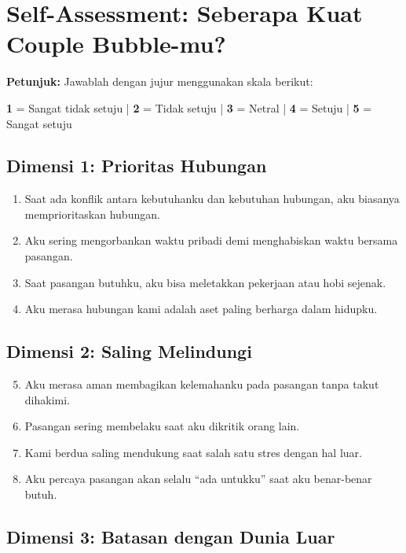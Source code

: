 \section{Self-Assessment: Seberapa Kuat Couple Bubble-mu?}

\begin{exercisebox}
\textbf{Petunjuk:} Jawablah dengan jujur menggunakan skala berikut:
\begin{center}
\textbf{1} = Sangat tidak setuju \quad | \quad \textbf{2} = Tidak setuju \quad | \quad \textbf{3} = Netral \quad | \quad \textbf{4} = Setuju \quad | \quad \textbf{5} = Sangat setuju
\end{center}

\subsection*{Dimensi 1: Prioritas Hubungan}

\begin{enumerate}
    \item Saat ada konflik antara kebutuhanku dan kebutuhan hubungan, aku biasanya memprioritaskan hubungan.
    \item Aku sering mengorbankan waktu pribadi demi menghabiskan waktu bersama pasangan.
    \item Saat pasangan butuhku, aku bisa meletakkan pekerjaan atau hobi sejenak.
    \item Aku merasa hubungan kami adalah aset paling berharga dalam hidupku.
\end{enumerate}

\subsection*{Dimensi 2: Saling Melindungi}

\begin{enumerate}
    \setcounter{enumi}{4}
    \item Aku merasa aman membagikan kelemahanku pada pasangan tanpa takut dihakimi.
    \item Pasangan sering membelaku saat aku dikritik orang lain.
    \item Kami berdua saling mendukung saat salah satu stres dengan hal luar.
    \item Aku percaya pasangan akan selalu ``ada untukku'' saat aku benar-benar butuh.
\end{enumerate}

\subsection*{Dimensi 3: Batasan dengan Dunia Luar}


\end{exercisebox}

